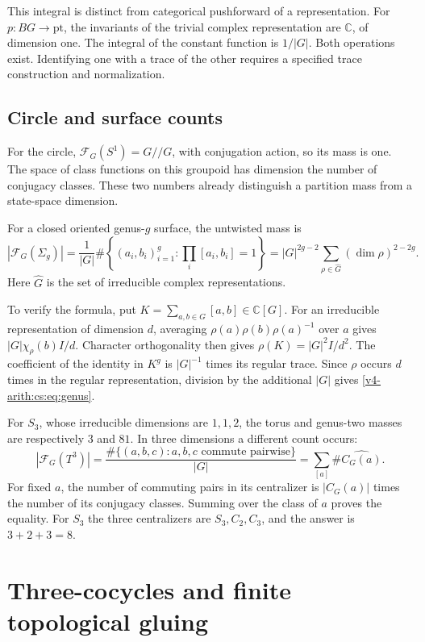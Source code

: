 This integral is distinct from categorical pushforward of a representation.
For \(p:BG\to\mathrm{pt}\), the invariants of the trivial complex
representation are \(\mathbb C\), of dimension one. The integral of the
constant function is \(1/|G|\). Both operations exist. Identifying one with
a trace of the other requires a specified trace construction and
normalization.

\subsection{Circle and surface counts}

For the circle, \(\mathcal F_G(S^1)=G//G\), with conjugation action, so its
mass is one. The space of class functions on this groupoid has dimension the
number of conjugacy classes. These two numbers already distinguish a
partition mass from a state-space dimension.

For a closed oriented genus-\(g\) surface, the untwisted mass is
\begin{equation}
 |\mathcal F_G(\Sigma_g)|
 =\frac1{|G|}\#\left\{(a_i,b_i)_{i=1}^g:
              \prod_i[a_i,b_i]=1\right\}
 =|G|^{2g-2}\sum_{\rho\in\widehat G}
                      (\dim\rho)^{2-2g}.
 \label{v4-arith:cs:eq:genus}
\end{equation}
Here \(\widehat G\) is the set of irreducible complex representations.

To verify the formula, put \(K=\sum_{a,b\in G}[a,b]\in\mathbb C[G]\). For an
irreducible representation of dimension \(d\), averaging
\(\rho(a)\rho(b)\rho(a)^{-1}\) over \(a\) gives \(|G|\chi_\rho(b)I/d\).
Character orthogonality then gives \(\rho(K)=|G|^2I/d^2\). The coefficient
of the identity in \(K^g\) is \(|G|^{-1}\) times its regular trace. Since
\(\rho\) occurs \(d\) times in the regular representation, division by the
additional \(|G|\) gives \eqref{v4-arith:cs:eq:genus}.

For \(S_3\), whose irreducible dimensions are \(1,1,2\), the torus and
genus-two masses are respectively \(3\) and \(81\). In three dimensions a
different count occurs:
\[
 |\mathcal F_G(T^3)|
 =\frac{\#\{(a,b,c):a,b,c\text{ commute pairwise}\}}{|G|}
 =\sum_{[a]}\#\widehat{C_G(a)}.
\]
For fixed \(a\), the number of commuting pairs in its centralizer is
\(|C_G(a)|\) times the number of its conjugacy classes. Summing over the
class of \(a\) proves the equality. For \(S_3\) the three centralizers are
\(S_3,C_2,C_3\), and the answer is \(3+2+3=8\).

\section{Three-cocycles and finite topological gluing}
\label{v4-arith:cs:topological}

